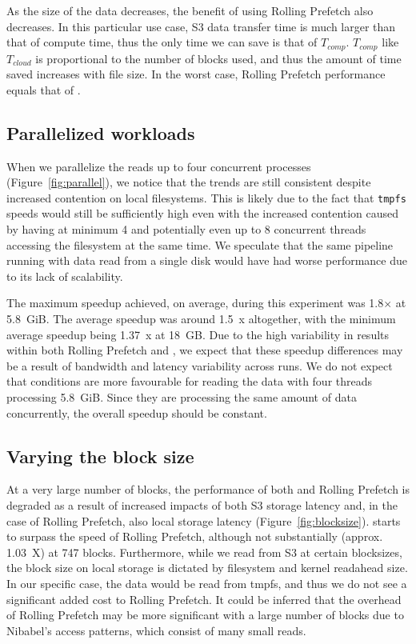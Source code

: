 \documentclass[conference]{IEEEtran}
\begin{document}
As the size of the data decreases, the benefit of using Rolling Prefetch also decreases. 
In this particular use case, S3 data transfer time is much larger
than that of compute time, thus the only time we can save is that of $T_{comp}$. $T_{comp}$ like ${T_{cloud}}$ is
proportional to the number of blocks used, and thus the amount of time saved increases with file size. In the 
worst case, Rolling Prefetch performance equals that of \sfs.

\subsection{Parallelized workloads}
When we parallelize the reads up to four concurrent processes (Figure~\ref{fig:parallel}), we notice that the trends are still consistent
despite increased contention on local filesystems. This is likely due to the fact that \texttt{tmpfs} speeds
would still be sufficiently high even with the increased contention caused by having at minimum 4 and 
potentially even up to 8 concurrent threads accessing the filesystem at the same time. We speculate that the same 
pipeline running with data read from a single disk would have had worse performance
due to its lack of scalability.

The maximum speedup achieved, on average, during this experiment was 1.8$\times$ at 5.8~GiB. The average speedup
was around 1.5~x altogether, with the minimum average speedup being 1.37~x at 18~GB. Due to the high
variability in results within both Rolling Prefetch and \sfs, we expect that these speedup differences may be a
result of bandwidth and latency variability across runs. We do not expect that conditions are more favourable
for reading the data with four threads processing 5.8~GiB. Since they are processing the
same amount of data concurrently, the overall speedup should be constant.

\subsection{Varying the block size}%

At a very large number of blocks, the performance of both \sfs and Rolling Prefetch is degraded as a result of 
increased impacts of both S3 storage latency and, in the case of Rolling Prefetch, also local storage latency (Figure~\ref{fig:blocksize}).  \sfs starts to surpass the speed of Rolling Prefetch, although not substantially (approx. 1.03~X) at 747 blocks.  Furthermore, while we read from S3
at certain blocksizes, the block size on local storage is dictated by filesystem and kernel readahead 
size. In our specific case, the data would be read from tmpfs, and thus we do not see a significant added cost
to Rolling Prefetch. It could be inferred that the overhead of Rolling Prefetch may be more significant with a large
number of blocks due to Nibabel's access patterns, which consist of many small reads.
\end{document}
